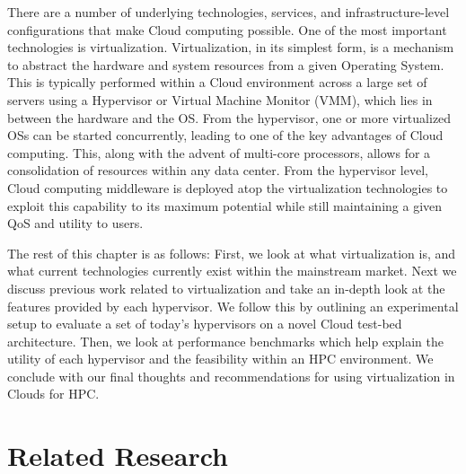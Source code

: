 There are a number of underlying technologies, services, and infrastructure-level configurations that make Cloud computing possible.  One of the most important technologies is virtualization. Virtualization, in its simplest form, is a mechanism to abstract the hardware and system resources from a given Operating System.  This is typically performed  within a Cloud environment across a large set of servers using a Hypervisor or Virtual Machine Monitor (VMM), which lies in between the hardware and the OS. From the hypervisor, one or more virtualized OSs can be started concurrently, leading to one of the key advantages of Cloud computing.  This, along with the advent of multi-core processors, allows for a consolidation of resources within any data center.  From the hypervisor level, Cloud computing middleware is deployed atop the virtualization technologies to exploit this capability to its maximum potential while still maintaining a given QoS and utility to users.

\begin{comment}
 \FIGURE{htb}
  {images/VMM.pdf}
  {1.0}
  {Virtual Machine Abstraction}
  {F:blah}
\end{comment}

The rest of this chapter is as follows:  First, we look at what virtualization is, and what current technologies currently exist within the mainstream market. Next we discuss previous work related to virtualization and take an in-depth look at the features provided by each hypervisor.  We follow this by outlining an experimental setup to evaluate a set of today's hypervisors on a novel Cloud test-bed architecture. Then, we look at performance benchmarks which help explain the utility of each hypervisor and the feasibility within an HPC environment. We conclude with our final thoughts and recommendations for using virtualization in Clouds for HPC.   


\section{Related Research}

